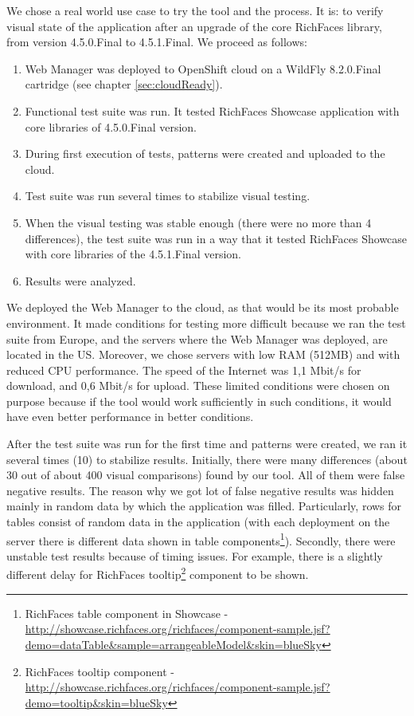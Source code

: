 \documentclass[11pt,oneside,final]{fithesis2}
\begin{document}
  We chose a real world use case to try the tool and the process. It is: to verify visual state of the application after an upgrade of 
  the core RichFaces library, from version 4.5.0.Final to 4.5.1.Final. We proceed as follows:
  
  \begin{enumerate}
   \item Web Manager was deployed to OpenShift cloud on a WildFly 8.2.0.Final cartridge (see chapter \ref{sec:cloudReady}).
   \item Functional test suite was run. It tested RichFaces Showcase application with core libraries of 4.5.0.Final version.
   \item During first execution of tests, patterns were created and uploaded to the cloud.
   \item Test suite was run several times to stabilize visual testing.
   \item When the visual testing was stable enough (there were no more than 4 differences), the test suite was run in a way that it
   tested RichFaces Showcase with core libraries of the 4.5.1.Final version.
   \item Results were analyzed.
  \end{enumerate}
  
  We deployed the Web Manager to the cloud, as that would be its most probable environment. It made conditions for testing more
  difficult because we ran the test suite from Europe, and the servers where the Web Manager was deployed, are located in the US.
  Moreover, we chose servers with low RAM (512MB) and with reduced CPU performance. The speed of the Internet was 1,1 Mbit/s
  for download, and 0,6 Mbit/s for upload. These limited conditions were chosen on purpose because if the tool would work 
  sufficiently in such conditions, it would have even better performance in better conditions.
  
  After the test suite was run for the first time and patterns were created, we ran it several times (10) to stabilize results. Initially, there
  were many differences (about 30 out of about 400 visual comparisons) found by our tool. All of them were false negative results. 
  The reason why we got lot of false negative results was hidden mainly in random data by which the application was filled. 
  Particularly, rows for tables consist of random data in the application (with each deployment on the server there is 
  different data shown in table 
  components\footnote{RichFaces table component in Showcase - 
  \url{http://showcase.richfaces.org/richfaces/component-sample.jsf?demo=dataTable&sample=arrangeableModel&skin=blueSky}}). 
  Secondly, there were unstable test results because of timing issues. For example, there is a slightly different delay for RichFaces
  tooltip\footnote{RichFaces tooltip component - 
  \url{http://showcase.richfaces.org/richfaces/component-sample.jsf?demo=tooltip&skin=blueSky}} component to be shown.
  
\end{document}
